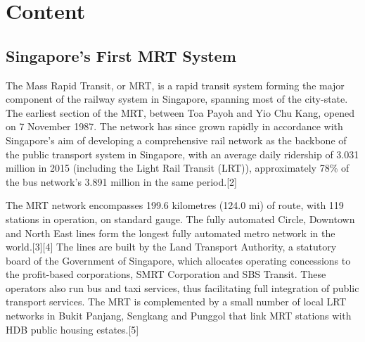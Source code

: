 \documentclass[a4paper,10pt]{article}
\title{}
\author{}
\date{}
\begin{document}

\section{Content}
\doublespacing
\subsection{Singapore's First MRT System}

The Mass Rapid Transit, or MRT, is a rapid transit system forming the major component of the railway system in Singapore, spanning most of the city-state. The earliest section of the MRT, between Toa Payoh and Yio Chu Kang, opened on 7 November 1987. The network has since grown rapidly in accordance with Singapore's aim of developing a comprehensive rail network as the backbone of the public transport system in Singapore, with an average daily ridership of 3.031 million in 2015 (including the Light Rail Transit (LRT)), approximately 78\% of the bus network's 3.891 million in the same period.[2]

The MRT network encompasses 199.6 kilometres (124.0 mi) of route, with 119 stations in operation, on standard gauge. The fully automated Circle, Downtown and North East lines form the longest fully automated metro network in the world.[3][4] The lines are built by the Land Transport Authority, a statutory board of the Government of Singapore, which allocates operating concessions to the profit-based corporations, SMRT Corporation and SBS Transit. These operators also run bus and taxi services, thus facilitating full integration of public transport services. The MRT is complemented by a small number of local LRT networks in Bukit Panjang, Sengkang and Punggol that link MRT stations with HDB public housing estates.[5]
\end{document}

